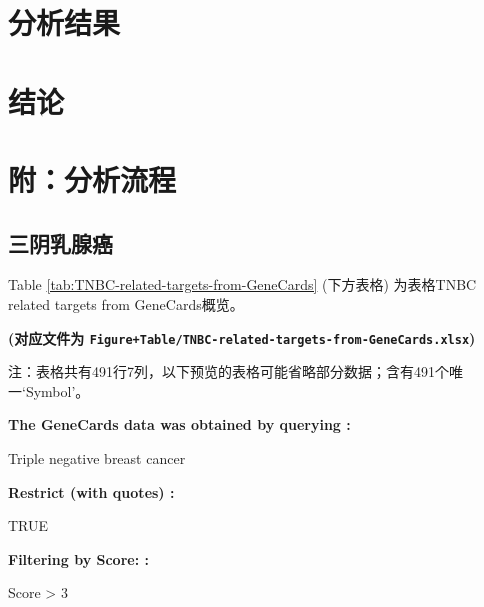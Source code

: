 \documentclass[
]{article}
\begin{document}
\hypertarget{results}{%
\section{分析结果}\label{results}}

\hypertarget{dis}{%
\section{结论}\label{dis}}

\hypertarget{workflow}{%
\section{附：分析流程}\label{workflow}}

\hypertarget{ux4e09ux9634ux4e73ux817aux764c}{%
\subsection{三阴乳腺癌}\label{ux4e09ux9634ux4e73ux817aux764c}}

Table \ref{tab:TNBC-related-targets-from-GeneCards} (下方表格) 为表格TNBC related targets from GeneCards概览。

\textbf{(对应文件为 \texttt{Figure+Table/TNBC-related-targets-from-GeneCards.xlsx})}

\begin{center}\begin{tcolorbox}[colback=gray!10, colframe=gray!50, width=0.9\linewidth, arc=1mm, boxrule=0.5pt]注：表格共有491行7列，以下预览的表格可能省略部分数据；含有491个唯一`Symbol'。
\end{tcolorbox}
\end{center}\begin{center}\begin{tcolorbox}[colback=gray!10, colframe=gray!50, width=0.9\linewidth, arc=1mm, boxrule=0.5pt]
\textbf{
The GeneCards data was obtained by querying
:}

\vspace{0.5em}

    Triple negative breast cancer

\vspace{2em}


\textbf{
Restrict (with quotes)
:}

\vspace{0.5em}

    TRUE

\vspace{2em}


\textbf{
Filtering by Score:
:}

\vspace{0.5em}

    Score > 3

\vspace{2em}
\end{tcolorbox}
\end{center}
\end{document}
